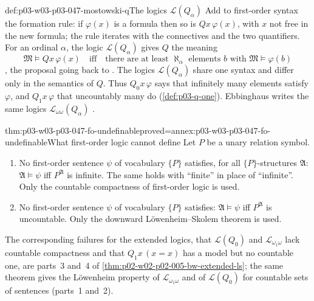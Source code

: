 \begin{hbdefinition}{def:p03-w03-p03-047-mostowski-q}{The logics \(\mathscr L(Q_\alpha)\)}
Add to first-order syntax the formation rule: if \(\varphi(x)\) is a formula
then so is \(Qx\,\varphi(x)\), with \(x\) not free in the new formula; the
rule iterates with the connectives and the two quantifiers.  For an ordinal
\(\alpha\), the logic \(\mathscr L(Q_\alpha)\) gives \(Q\) the meaning
\[
 \mathfrak M\models Qx\,\varphi(x)
 \quad\text{iff}\quad
 \text{there are at least }\aleph_\alpha\text{ elements }b
 \text{ with }\mathfrak M\models\varphi(b)
\]
\cite[Ch.~I, \S1.5, p.~8]{Barwise1985BackgroundAims}, the proposal going back to
\cite{Mostowski1957}.  The logics \(\mathscr L(Q_\alpha)\) share one syntax
and differ only in the semantics of \(Q\).  Thus \(Q_0x\,\varphi\) says that
infinitely many elements satisfy \(\varphi\), and \(Q_1x\,\varphi\) that
uncountably many do (\cref{def:p03-q-one}).  Ebbinghaus writes the same
logics \(\mathscr L_{\omega\omega}(Q_\alpha)\)
\cite[Ch.~II, \S2.2, p.~34]{Ebbinghaus1985ExtendedLogics}.
\end{hbdefinition}

\begin{hbtheorem}{thm:p03-w03-p03-047-fo-undefinable}{proved=annex:p03-w03-p03-047-fo-undefinable}{What first-order logic cannot define}
Let \(P\) be a unary relation symbol.
\begin{enumerate}
 \item No first-order sentence \(\psi\) of vocabulary \(\{P\}\) satisfies,
       for all \(\{P\}\)-structures \(\mathfrak A\):
       \(\mathfrak A\models\psi\) iff \(P^{\mathfrak A}\) is infinite.  The
       same holds with ``finite'' in place of ``infinite''.  Only the
       countable compactness of first-order logic is used.
 \item No first-order sentence \(\psi\) of vocabulary \(\{P\}\) satisfies:
       \(\mathfrak A\models\psi\) iff \(P^{\mathfrak A}\) is uncountable.
       Only the downward L\"owenheim--Skolem theorem is used.
\end{enumerate}
\end{hbtheorem}

The corresponding failures for the extended logics, that \(\mathscr L(Q_0)\)
and \(\mathscr L_{\omega_1\omega}\) lack countable compactness and that
\(Q_1x\,(x=x)\) has a model but no countable one, are parts~3 and~4 of
\cref{thm:p02-w02-p02-005-bw-extended-ls}; the same theorem gives the
L\"owenheim property of \(\mathscr L_{\omega_1\omega}\) and of
\(\mathscr L(Q_0)\) for countable sets of sentences (parts~1 and~2).

